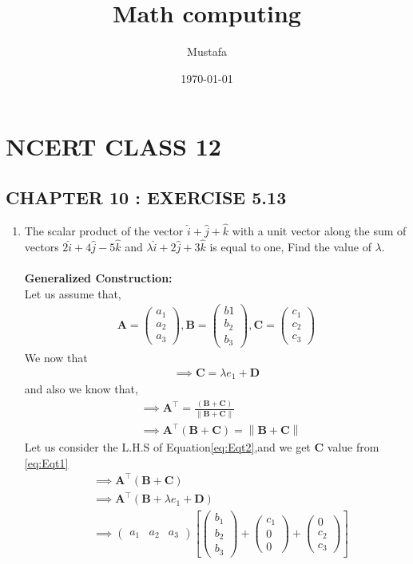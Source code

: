 \documentclass[10pt, a4paper]{article}
\title{ Math computing}
\author{ Mustafa}
\date{\today}
\newcommand{\myvec}[1]{\ensuremath{\begin{pmatrix}#1\end{pmatrix}}}
\let\vec\mathbf
\providecommand{\brak}[1]{\ensuremath{\left(#1\right)}}
\providecommand{\sbrak}[1]{\ensuremath{{}\left[#1\right]}}
\providecommand{\norm}[1]{\left\lVert#1\right\rVert}
\begin{document}
\section*{NCERT CLASS 12}
\subsection*{CHAPTER 10 : EXERCISE 5.13}
\begin{enumerate}
\item\textbf{}The scalar product of the vector $\hat{i}+\hat{j}+\hat{k}$ with a unit vector along the sum of vectors $2\hat{i}+4\hat{j}-5\hat{k}$ and $\lambda\hat{i}+2\hat{j}+3\hat{k}$ is equal to one, Find the value of $\lambda$.
\\\\
\textbf{Generalized Construction:}\\
Let us assume that,
\begin{align}
\vec{A} =\myvec{a_1\\a_2\\a_3} , \vec{B}=\myvec{b1\\b_2\\b_3} , \vec{C}=\myvec{c_1\\c_2\\c_3}
\end{align}
We now that \\
\begin{align}
    \implies \vec{C}=\lambda e_1+\vec{D}\label{eq:Eqt1}
    \end{align}
and also we know that,
\begin{align}
       &\implies \vec{A}^\top = \frac{\brak{\vec{B}+\vec{C}}}{\norm{\vec{B}+\vec{C}}}\\
       &\implies \vec{A}^\top \brak{\vec{B}+\vec{C}}=\norm{\vec{B}+\vec{C}} \label{eq:Eqt2}
\end{align}
Let us consider the L.H.S of Equation\eqref{eq:Eqt2},and we get $\vec{C}$ value from \eqref{eq:Eqt1}
\begin{align}
    &\implies \vec{A}^\top \brak{\vec{B}+\vec{C}}\\
   &\implies \vec{A}^\top \brak{\vec{B}+\lambda e_1+\vec{D}}\\
   &\implies \myvec{a_1&a_2&a_3}\sbrak{\myvec{b_1\\b_2\\b_3}+\myvec{c_1\\0\\0}+\myvec{0\\c_2\\c_3}}\\

\end{align}
\end{enumerate}
\end{document}
